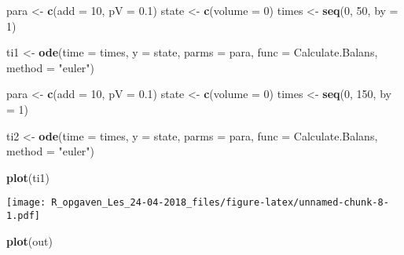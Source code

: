 \documentclass[]{article}
\newenvironment{Shaded}{\begin{snugshade}}{\end{snugshade}}
\newcommand{\KeywordTok}[1]{\textcolor[rgb]{0.13,0.29,0.53}{\textbf{#1}}}
\newcommand{\DataTypeTok}[1]{\textcolor[rgb]{0.13,0.29,0.53}{#1}}
\newcommand{\DecValTok}[1]{\textcolor[rgb]{0.00,0.00,0.81}{#1}}
\newcommand{\FloatTok}[1]{\textcolor[rgb]{0.00,0.00,0.81}{#1}}
\newcommand{\StringTok}[1]{\textcolor[rgb]{0.31,0.60,0.02}{#1}}
\newcommand{\NormalTok}[1]{#1}
\begin{document}
\begin{Shaded}
\begin{Highlighting}[]
\NormalTok{para <-}\StringTok{ }\KeywordTok{c}\NormalTok{(}\DataTypeTok{add =} \DecValTok{10}\NormalTok{, }\DataTypeTok{pV =} \FloatTok{0.1}\NormalTok{)}
\NormalTok{state <-}\StringTok{ }\KeywordTok{c}\NormalTok{(}\DataTypeTok{volume =} \DecValTok{0}\NormalTok{)}
\NormalTok{times <-}\StringTok{ }\KeywordTok{seq}\NormalTok{(}\DecValTok{0}\NormalTok{, }\DecValTok{50}\NormalTok{,  }\DataTypeTok{by =} \DecValTok{1}\NormalTok{)}

\NormalTok{ti1 <-}\StringTok{ }\KeywordTok{ode}\NormalTok{(}\DataTypeTok{time =}\NormalTok{ times,}
           \DataTypeTok{y =}\NormalTok{ state,}
           \DataTypeTok{parms =}\NormalTok{ para,}
           \DataTypeTok{func =}\NormalTok{ Calculate.Balans,}
           \DataTypeTok{method =} \StringTok{"euler"}\NormalTok{)}

\NormalTok{para <-}\StringTok{ }\KeywordTok{c}\NormalTok{(}\DataTypeTok{add =} \DecValTok{10}\NormalTok{, }\DataTypeTok{pV =} \FloatTok{0.1}\NormalTok{)}
\NormalTok{state <-}\StringTok{ }\KeywordTok{c}\NormalTok{(}\DataTypeTok{volume =} \DecValTok{0}\NormalTok{)}
\NormalTok{times <-}\StringTok{ }\KeywordTok{seq}\NormalTok{(}\DecValTok{0}\NormalTok{, }\DecValTok{150}\NormalTok{,  }\DataTypeTok{by =} \DecValTok{1}\NormalTok{)}

\NormalTok{ti2 <-}\StringTok{ }\KeywordTok{ode}\NormalTok{(}\DataTypeTok{time =}\NormalTok{ times,}
           \DataTypeTok{y =}\NormalTok{ state,}
           \DataTypeTok{parms =}\NormalTok{ para,}
           \DataTypeTok{func =}\NormalTok{ Calculate.Balans,}
           \DataTypeTok{method =} \StringTok{"euler"}\NormalTok{)}
\end{Highlighting}
\end{Shaded}

\begin{Shaded}
\begin{Highlighting}[]
\KeywordTok{plot}\NormalTok{(ti1)}
\end{Highlighting}
\end{Shaded}

\texttt{[image: R\_opgaven\_Les\_24-04-2018\_files/figure-latex/unnamed-chunk-8-1.pdf]}

\begin{Shaded}
\begin{Highlighting}[]
\KeywordTok{plot}\NormalTok{(out)}
\end{Highlighting}
\end{Shaded}
\end{document}
